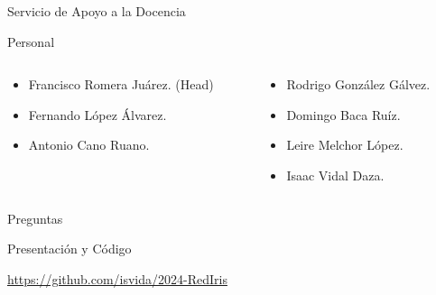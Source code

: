 \documentclass[aspectratio=169]{beamer}
\begin{document}
\begin{frame}{Servicio de Apoyo a la Docencia}
    \begin{block}{\centering Personal}
        \begin{columns}
            \begin{column}{0.5\linewidth}

                \begin{itemize}
                    \item Francisco Romera Juárez. (Head)
                    \item Fernando López Álvarez.
                    \item Antonio Cano Ruano.
                \end{itemize}

            \end{column}
            \begin{column}{0.5\linewidth}
                \begin{itemize}
                    \item Rodrigo González Gálvez.
                    \item Domingo Baca Ruíz.
                    \item Leire Melchor López.
                    \item Isaac Vidal Daza.
                \end{itemize}
            \end{column}
        \end{columns}
    \end{block}
\end{frame}


\begin{frame}{Preguntas}
    \begin{block}{Presentación y Código}
    \begin{center}
        \href{https://github.com/isvida/2024-RedIris}{https://github.com/isvida/2024-RedIris}
    \end{center}
\end{block}
\end{frame}
\end{document}
